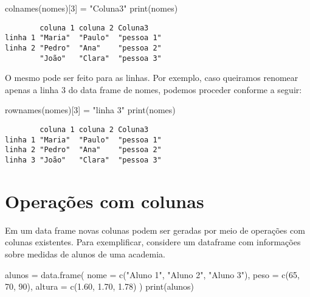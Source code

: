 \documentclass[
  letterpaper,
  DIV=11,
  numbers=noendperiod]{scrreprt}
\newenvironment{Shaded}{\begin{snugshade}}{\end{snugshade}}
\newcommand{\AttributeTok}[1]{\textcolor[rgb]{0.40,0.45,0.13}{#1}}
\newcommand{\DecValTok}[1]{\textcolor[rgb]{0.68,0.00,0.00}{#1}}
\newcommand{\FloatTok}[1]{\textcolor[rgb]{0.68,0.00,0.00}{#1}}
\newcommand{\FunctionTok}[1]{\textcolor[rgb]{0.28,0.35,0.67}{#1}}
\newcommand{\NormalTok}[1]{\textcolor[rgb]{0.00,0.23,0.31}{#1}}
\newcommand{\OtherTok}[1]{\textcolor[rgb]{0.00,0.23,0.31}{#1}}
\newcommand{\StringTok}[1]{\textcolor[rgb]{0.13,0.47,0.30}{#1}}
\begin{document}
\begin{Shaded}
\begin{Highlighting}[]
\FunctionTok{colnames}\NormalTok{(nomes)[}\DecValTok{3}\NormalTok{] }\OtherTok{=} \StringTok{"Coluna3"}
\FunctionTok{print}\NormalTok{(nomes)}
\end{Highlighting}
\end{Shaded}

\begin{verbatim}
        coluna 1 coluna 2 Coluna3   
linha 1 "Maria"  "Paulo"  "pessoa 1"
linha 2 "Pedro"  "Ana"    "pessoa 2"
        "João"   "Clara"  "pessoa 3"
\end{verbatim}

O mesmo pode ser feito para as linhas. Por exemplo, caso queiramos
renomear apenas a linha 3 do data frame de nomes, podemos proceder
conforme a seguir:

\begin{Shaded}
\begin{Highlighting}[]
\FunctionTok{rownames}\NormalTok{(nomes)[}\DecValTok{3}\NormalTok{] }\OtherTok{=} \StringTok{"linha 3"}
\FunctionTok{print}\NormalTok{(nomes)}
\end{Highlighting}
\end{Shaded}

\begin{verbatim}
        coluna 1 coluna 2 Coluna3   
linha 1 "Maria"  "Paulo"  "pessoa 1"
linha 2 "Pedro"  "Ana"    "pessoa 2"
linha 3 "João"   "Clara"  "pessoa 3"
\end{verbatim}

\section{Operações com colunas}\label{operauxe7uxf5es-com-colunas}

Em um data frame novas colunas podem ser geradas por meio de operações
com colunas existentes. Para exemplificar, considere um dataframe com
informações sobre medidas de alunos de uma academia.

\begin{Shaded}
\begin{Highlighting}[]
\NormalTok{alunos }\OtherTok{=} \FunctionTok{data.frame}\NormalTok{(}
\AttributeTok{nome =} \FunctionTok{c}\NormalTok{(}\StringTok{"Aluno 1"}\NormalTok{, }\StringTok{"Aluno 2"}\NormalTok{, }\StringTok{"Aluno 3"}\NormalTok{),}
\AttributeTok{peso =} \FunctionTok{c}\NormalTok{(}\DecValTok{65}\NormalTok{, }\DecValTok{70}\NormalTok{, }\DecValTok{90}\NormalTok{),}
\AttributeTok{altura =} \FunctionTok{c}\NormalTok{(}\FloatTok{1.60}\NormalTok{, }\FloatTok{1.70}\NormalTok{, }\FloatTok{1.78}\NormalTok{)}
\NormalTok{)}
\FunctionTok{print}\NormalTok{(alunos)}
\end{Highlighting}
\end{Shaded}
\end{document}
